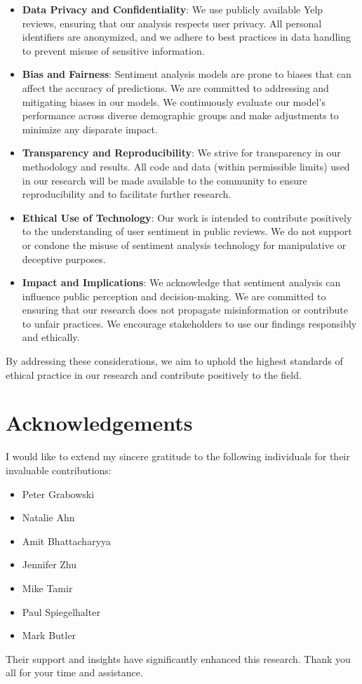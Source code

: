 \documentclass[12pt]{article}
\begin{document}
\begin{itemize}
    \item \textbf{Data Privacy and Confidentiality}: We use publicly available Yelp reviews, ensuring that our analysis respects user privacy. All personal identifiers are anonymized, and we adhere to best practices in data handling to prevent misuse of sensitive information.

    \item \textbf{Bias and Fairness}: Sentiment analysis models are prone to biases that can affect the accuracy of predictions. We are committed to addressing and mitigating biases in our models. We continuously evaluate our model's performance across diverse demographic groups and make adjustments to minimize any disparate impact.
    
    \item \textbf{Transparency and Reproducibility}: We strive for transparency in our methodology and results. All code and data (within permissible limits) used in our research will be made available to the community to ensure reproducibility and to facilitate further research.
    
    \item \textbf{Ethical Use of Technology}: Our work is intended to contribute positively to the understanding of user sentiment in public reviews. We do not support or condone the misuse of sentiment analysis technology for manipulative or deceptive purposes.
    
    \item \textbf{Impact and Implications}: We acknowledge that sentiment analysis can influence public perception and decision-making. We are committed to ensuring that our research does not propagate misinformation or contribute to unfair practices. We encourage stakeholders to use our findings responsibly and ethically.
\end{itemize}

By addressing these considerations, we aim to uphold the highest standards of ethical practice in our research and contribute positively to the field.

\section*{Acknowledgements}
I would like to extend my sincere gratitude to the following individuals for their invaluable contributions:
\begin{itemize}
  \item Peter Grabowski
  \item Natalie Ahn
  \item Amit Bhattacharyya
  \item Jennifer Zhu
  \item Mike Tamir
  \item Paul Spiegelhalter
  \item Mark Butler
\end{itemize}
Their support and insights have significantly enhanced this research. Thank you all for your time and assistance.
\end{document}
